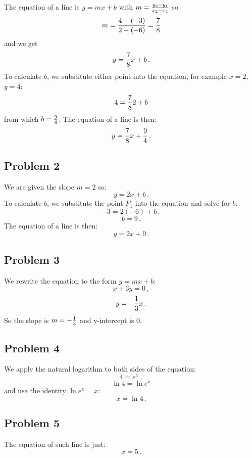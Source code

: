 \documentclass[10pt]{article}
\begin{document}
The equation of a line is $y=mx+b$ with $m={y_2-y_1\over x_2-x_1}$ so
$$m={4-(-3)\over2-(-6)}={7\over8}$$
and we get
$$y={7\over8}x+b\,.$$
To calculate $b$, we substitute either point into the equation, for example
$x=2$, $y=4$:
$$4={7\over8}2+b$$
from which $b={9\over4}$. The equation of a line is then:
$$y={7\over8}x+{9\over 4}\,.$$

\subsection*{Problem 2}

We are given the slope $m=2$ so:
$$y=2x+b\,.$$
To calculate $b$, we substitute the point $P_1$ into the equation and solve for
$b$:
$$-3=2(-6)+b\,,$$
$$b=9\,.$$
The equation of a line is then:
$$y = 2x+9\,.$$

\subsection*{Problem 3}

We rewrite the equation to the form $y=mx+b$:
$$x+3y=0\,,$$
$$y=-{1\over3}x\,.$$
So the slope is $m=-{1\over3}$ and y-intercept is $0$.

\subsection*{Problem 4}

We apply the natural logarithm to both sides of the equation:
$$4=e^x\,,$$
$$\ln 4=\ln e^x$$
and use the identity $\ln e^x = x$:
$$x=\ln 4\,.$$

\subsection*{Problem 5}

The equation of such line is just:
$$x=5\,.$$
\end{document}
